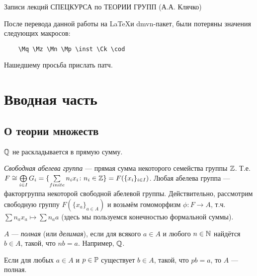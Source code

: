 \documentclass[10pt,a4paper]{article}%
\newcommand{\inst}{}
\begin{document}
\begin{center}{\sf Записи лекций СПЕЦКУРСА по ТЕОРИИ ГРУПП (А.А.
Клячко)}
\end{center}
\begin{petit}
  После перевода данной работы на \LaTeX и dmvn-пакет, 
  были потеряны значения следующих макросов:
  \begin{verbatim}
    \Mq \Mz \Mn \Mp \inst \Ck \cod
   \end{verbatim}
  Нашедшему просьба прислать патч.
\end{petit}

\section{Вводная часть}
\subsection{О теории множеств}

\begin{problem}$\mathbb Q$ не раскладывается в прямую
сумму.
\end{problem}

\emph{Свободная абелева группа}
--- прямая сумма некоторого семейства группы $\mathbb Z$. Т.е. $F\cong
\bigoplus\limits_{i\in I}G_i=\{\sum\limits_{finite}n_i x_i\colon
n_i\in\mathbb Z\}=F(\{x_i\}_{i\in I})$. Любая абелева группа
--- факторгруппа некоторой свободной абелевой группы.
Действительно, рассмотрим свободную группу $F(\{x_a\}_{a\in A})$ и
возьмём гомоморфизм $\phi\colon F\rightarrow A$, т.ч. $\sum n_a
x_a\mapsto\sum n_a a$ (здесь мы пользуемся конечностью формальной
суммы).

$A$ ---  \emph{полная} (или
\emph{делимая}), если для всякого $a\in A$ и
любого $n\in\mathbb N$ найдётся $b\in A$, такой, что $nb=a$. Например,
$\mathbb Q$.

\begin{stm} Если для любых $a\in A$ и
$p\in \mathbb P$ существует $b\in A$, такой, что $pb=a$, то $A$ ---
полная.
\end{stm}
\end{document}
